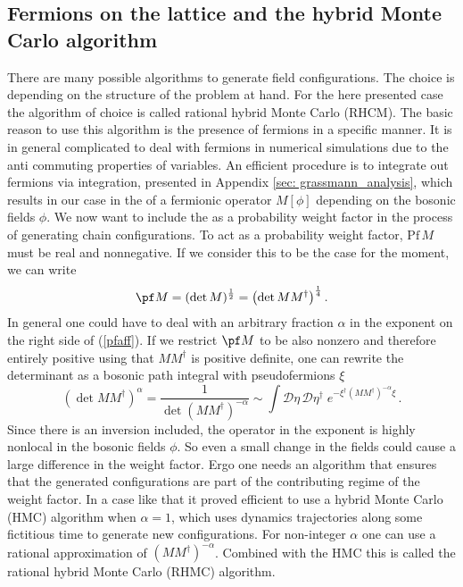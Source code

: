 \subsection[Fermions on the lattice and the HMC algorithm]{Fermions on the lattice and the hybrid Monte Carlo algorithm}
\label{sec: hmc_alg}
%
%
There are many possible algorithms to generate field configurations. The choice is depending on the structure of the problem at hand. For the here presented case the algorithm of choice is called rational hybrid Monte Carlo (RHCM). The basic reason to use this algorithm is the presence of fermions in a specific manner. It is in general complicated to deal with fermions in numerical simulations due to the anti commuting properties of  variables. An efficient procedure is to integrate out fermions via  integration, presented in Appendix \ref{sec: grassmann_analysis}, which results in our case in the  of a fermionic operator $M[\phi]$ depending on the bosonic fields $\phi$. We now want to include the  as a probability weight factor in the process of generating  chain configurations. To act as a probability weight factor, $\text{Pf}\,M$ must be real and nonnegative. If we consider this to be the case for the moment, we can write
%
%
\begin{equation}
\pf M = (\det M)^{\frac{1}{2}} = \left( \det MM^{\dagger}\right)^{\frac{1}{4}} .
\label{pfaff}
\end{equation}
%
%
In general one could have to deal with an arbitrary fraction $\alpha$ in the exponent on the right side of (\ref{pfaff}). If we restrict $\pf M$ to be also nonzero and therefore entirely positive using that $MM^{\dagger}$ is positive definite, one can rewrite the determinant as a bosonic path integral with pseudofermions $\xi$
%
%
\begin{equation}
\left( \det MM^{\dagger}\right)^{\alpha} = \dfrac{1}{\det \left(MM^{\dagger}\right)^{-\alpha}} \sim \int \mathcal{D}\eta\,\mathcal{D}\eta^{\dagger}\; e^{-\xi^{\dagger}(MM^{\dagger})^{-\alpha}\xi}\, .
\end{equation}
%
%
Since there is an inversion included, the operator in the exponent is highly nonlocal in the bosonic fields $\phi$. So even a small change in the fields could cause a large difference in the weight factor. Ergo one needs an algorithm that ensures that the generated configurations are part of the contributing regime of the weight factor. In a case like that it proved efficient to use a hybrid Monte Carlo (HMC) algorithm when $\alpha=1$, which uses  dynamics trajectories along some fictitious time to generate new configurations. For non-integer $\alpha$ one can use a rational approximation of $\left(MM^{\dagger}\right)^{-\alpha}$. Combined with the HMC this is called the rational hybrid Monte Carlo (RHMC) algorithm.\\
